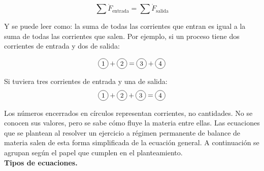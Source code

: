 \[
\sum \dot{F}_{\text{entrada}} = \sum \dot{F}_{\text{salida}}
\]

Y se puede leer como: la suma de todas las corrientes que entran es
igual a la suma de todas las corrientes que salen. Por ejemplo, si
un proceso tiene dos corrientes de entrada y dos de salida:

\[
\corriente{1} + \corriente{2} = \corriente{3} + \corriente{4}
\]

Si tuviera tres corrientes de entrada y una de salida:
\[
\corriente{1} + \corriente{2} + \corriente{3} = \corriente{4}
\]

Los números encerrados en círculos representan corrientes, no
cantidades. No se conocen sus valores, pero se sabe cómo fluye la
materia entre ellas. Las ecuaciones que se plantean al resolver un
ejercicio a régimen permanente de balance de materia salen de esta
forma simplificada de la ecuación general. A continuación se agrupan
según el papel que cumplen en el planteamiento. \\

\textbf{Tipos de ecuaciones.}

